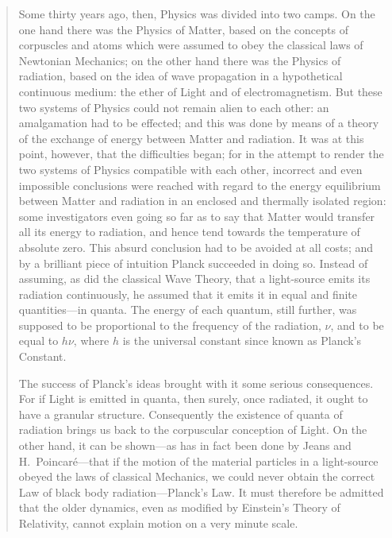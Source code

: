 \begin{quotation}
Some thirty years ago, then, Physics was divided into two camps. On the
one hand there was the Physics of Matter, based on the concepts of
corpuscles and atoms which were assumed to obey the classical laws of
Newtonian Mechanics; on the other hand there was the Physics of
radiation, based on the idea of wave propagation in a hypothetical
continuous medium: the ether of Light and of electromagnetism. But these
two systems of Physics could not remain alien to each other: an
amalgamation had to be effected; and this was done by means of a theory
of the exchange of energy between Matter and radiation. It was at this
point, however, that the difficulties began; for in the attempt to
render the two systems of Physics compatible with each other, incorrect
and even impossible conclusions were reached with regard to the energy
equilibrium between Matter and radiation in an enclosed and thermally
isolated region: some investigators even going so far as to say that
Matter would transfer all its energy to radiation, and hence tend
towards the temperature of absolute zero. This absurd conclusion had to
be avoided at all costs; and by a brilliant piece of intuition Planck
succeeded in doing so. Instead of assuming, as did the classical Wave
Theory, that a light-source emits its radiation continuously, he assumed
that it emits it in equal and finite quantities---in quanta. The energy
of each quantum, still further, was supposed to be proportional to the
frequency of the radiation, $\nu$, and to be equal to $h\nu$,
where $h$ is the universal constant since known as Planck's
Constant.

The success of Planck's ideas brought with it some serious consequences.
For if Light is emitted in quanta, then surely, once radiated, it ought
to have a granular structure. Consequently the existence of quanta of
radiation brings us back to the corpuscular conception of Light. On the
other hand, it can be shown---as has in fact been done by Jeans and H.\ 
Poincaré---that if the motion of the material particles in a
light-source obeyed the laws of classical Mechanics, we could never
obtain the correct Law of black body radiation---Planck's Law. It must
therefore be admitted that the older dynamics, even as modified by
Einstein's Theory of Relativity, cannot explain motion on a very minute
scale.


\end{quotation}

